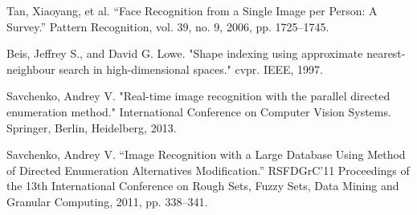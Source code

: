 \cleardoublepage
{}
{}
\begin{thebibliography}{99}
Tan, Xiaoyang, et al. “Face Recognition from a Single Image per Person: A Survey.” Pattern Recognition, vol. 39, no. 9, 2006, pp. 1725–1745.

Beis, Jeffrey S., and David G. Lowe. "Shape indexing using approximate nearest-neighbour search in high-dimensional spaces." cvpr. IEEE, 1997.

Savchenko, Andrey V. "Real-time image recognition with the parallel directed enumeration method." International Conference on Computer Vision Systems. Springer, Berlin, Heidelberg, 2013.

Savchenko, Andrey V. “Image Recognition with a Large Database Using Method of Directed Enumeration Alternatives Modification.” RSFDGrC’11 Proceedings of the 13th International Conference on Rough Sets, Fuzzy Sets, Data Mining and Granular Computing, 2011, pp. 338–341.
\end{thebibliography}
